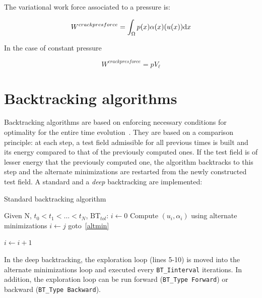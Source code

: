 \documentclass[10pt,oneside]{memoir}
\let\div\relax
\DeclareMathOperator*{\div}{div}
\begin{document}
The variational work force associated to a pressure is:

$$ W^{crack pres force} = \int_{\Omega} p(x)\alpha(x)\div(u(x)) \mathrm{d}x $$ 

In the case of constant pressure 

$$ W^{crack pres force} = p V_{\ell} $$ 




\section{Backtracking algorithms}
\label{sec:BT}
Backtracking algorithms are based on enforcing necessary conditions for optimality for the entire time evolution~\cite{Bourdin-2007a}. They are based on a comparison principle: at each step, a test field admissible for all previous times is built and its energy compared to that of the previously computed ones. If the test field is of lesser energy that the previously computed one, the algorithm backtracks to this step and the alternate minimizations are restarted from the newly constructed test field. A standard and a \emph{deep} backtracking are implemented:

\begin{algorithm}
	\caption{Standard backtracking algorithm}
	\label{algo:StdBT}
		\begin{algorithmic}[1]
			\State Given N, $t_0 < t_1 < \dots < t_N$, $\mathrm{BT}_{tol}$:
			\State $i \leftarrow 0$
			\Repeat
				\State Compute $(u_i,\alpha_i)$ using alternate minimizations\label{altmin}
						\State $i \leftarrow j$
						\State goto~\ref{altmin}
					\EndIf	
				\EndFor
				
			\State $i \leftarrow i+1$
		\end{algorithmic}
\end{algorithm}

In the deep backtracking, the exploration loop (lines 5-10) is moved into the alternate minimizations loop and executed every \verb+BT_Iinterval+ iterations. In addition, the exploration loop can be run forward (\verb+BT_Type Forward+) or backward (\verb+BT_Type Backward+).
\end{document}
